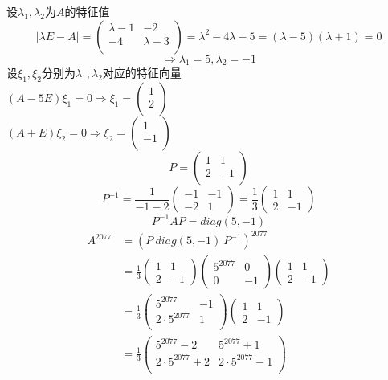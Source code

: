 \documentclass[a4paper]{article}
\begin{document}
设$\lambda_1,\lambda_2$为$A$的特征值\\
$$\left| \lambda E -A\right| =\begin{pmatrix}
    \lambda-1&-2\\
    -4&\lambda -3\\
\end{pmatrix}=\lambda^2-4\lambda -5=(\lambda-5)(\lambda +1)=0$$
$$\Rightarrow \lambda_1=5,\lambda_2=-1$$
设$\xi_1,\xi_2$分别为$\lambda_1,\lambda_2$对应的特征向量\\
$(A-5E)\xi_1=0\Rightarrow \xi_1=\begin{pmatrix}
    1\\
    2\\
\end{pmatrix}$\\
$(A+E)\xi_2=0 \Rightarrow \xi_2=\begin{pmatrix}
    1\\
    -1\\
\end{pmatrix}$\\
$$P=\begin{pmatrix}
    1&1\\
    2&-1\\
\end{pmatrix}$$
$$P^{-1}=\frac{1}{-1-2}\begin{pmatrix}
    -1&-1\\
    -2&1
\end{pmatrix}=\frac{1}{3}\begin{pmatrix}
    1&1\\
    2&-1
\end{pmatrix}$$
$$P^{-1}AP=diag(5,-1)$$
\begin{align*}
    A^{2077}&=(P\ diag(5,-1)\ P^{-1})^{2077}\\
    &=\frac{1}{3} \begin{pmatrix}
        1&1\\
        2&-1
    \end{pmatrix} \begin{pmatrix}
        5^{2077}&0\\
        0&-1
    \end{pmatrix}\begin{pmatrix}
        1&1\\
        2&-1
    \end{pmatrix}\\
    &=\frac{1}{3} \begin{pmatrix}
        5^{2077}&-1\\
        2\cdot 5^{2077}&1\\
    \end{pmatrix} \begin{pmatrix}
        1&1\\
        2&-1
    \end{pmatrix}\\
    &=\frac{1}{3}\begin{pmatrix}
        5^{2077}-2&5^{2077}+1\\
        2\cdot 5^{2077}+2&2\cdot 5^{2077}-1\\
    \end{pmatrix}
\end{align*}
\end{document}
